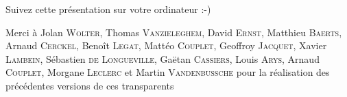 \begin{frame}
  \begin{center}\Large
  Suivez cette présentation sur votre ordinateur :-)

  \vspace{1cm}
  \end{center}
\end{frame}


\begin{frame}
  \maketitle
  Merci à Jolan \textsc{Wolter}, Thomas \textsc{Vanzieleghem}, David \textsc{Ernst}, Matthieu \textsc{Baerts}, Arnaud \textsc{Cerckel}, Benoît \textsc{Legat}, Mattéo \textsc{Couplet}, Geoffroy \textsc{Jacquet}, Xavier \textsc{Lambein}, Sébastien \textsc{de Longueville}, Gaëtan \textsc{Cassiers}, Louis \textsc{Arys}, Arnaud \textsc{Couplet}, Morgane \textsc{Leclerc} et Martin \textsc{Vandenbussche} pour la réalisation des précédentes versions de ces transparents
\end{frame}
